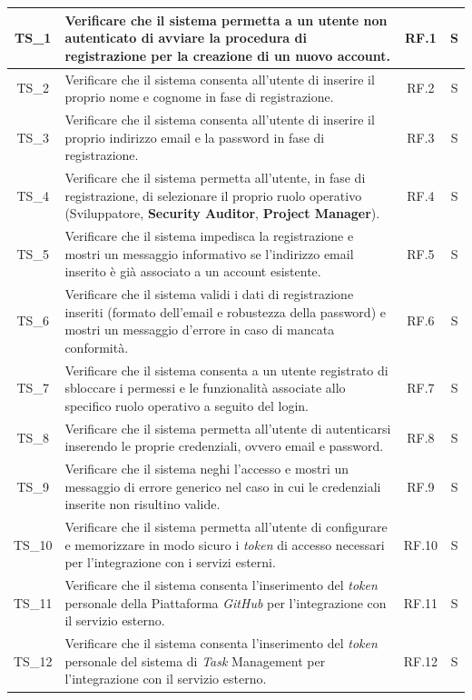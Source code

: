 \documentclass[12pt, a4paper]{article}
\newlength{\LargColVal} %
\begin{document}
\begin{xltabular}{\textwidth}{|c|X|C{\LargColVal}|C{\LargColVal}|}
    TS\_1 & Verificare che il sistema permetta a un utente non autenticato di avviare la procedura di registrazione per la creazione di un nuovo account. & RF.1 & S \\ \hline
    TS\_2 & Verificare che il sistema consenta all'utente di inserire il proprio nome e cognome in fase di registrazione. & RF.2 & S \\ \hline
    TS\_3 & Verificare che il sistema consenta all'utente di inserire il proprio indirizzo email e la password in fase di registrazione. & RF.3 & S \\ \hline
    TS\_4 & Verificare che il sistema permetta all'utente, in fase di registrazione, di selezionare il proprio ruolo operativo (Sviluppatore, \textbf{Security Auditor}, \textbf{Project Manager}). & RF.4 & S \\ \hline
    TS\_5 & Verificare che il sistema impedisca la registrazione e mostri un messaggio informativo se l'indirizzo email inserito è già associato a un account esistente. & RF.5 & S \\ \hline
    TS\_6 & Verificare che il sistema validi i dati di registrazione inseriti (formato dell'email e robustezza della password) e mostri un messaggio d'errore in caso di mancata conformità. & RF.6 & S \\ \hline
    TS\_7 & Verificare che il sistema consenta a un utente registrato di sbloccare i permessi e le funzionalità associate allo specifico ruolo operativo a seguito del login. & RF.7 & S \\ \hline
    TS\_8 & Verificare che il sistema permetta all'utente di autenticarsi inserendo le proprie credenziali, ovvero email e password. & RF.8 & S \\ \hline
    TS\_9 & Verificare che il sistema neghi l'accesso e mostri un messaggio di errore generico nel caso in cui le credenziali inserite non risultino valide. & RF.9 & S \\ \hline
    TS\_10 & Verificare che il sistema permetta all'utente di configurare e memorizzare in modo sicuro i \textit{token} di accesso necessari per l'integrazione con i servizi esterni. & RF.10 & S \\ \hline
    TS\_11 & Verificare che il sistema consenta l'inserimento del \textit{token} personale della Piattaforma \textit{GitHub} per l'integrazione con il servizio esterno. & RF.11 & S \\ \hline
    TS\_12 & Verificare che il sistema consenta l'inserimento del \textit{token} personale del sistema di \textit{Task} Management per l'integrazione con il servizio esterno. & RF.12 & S \\ \hline

\end{xltabular}
\end{document}
